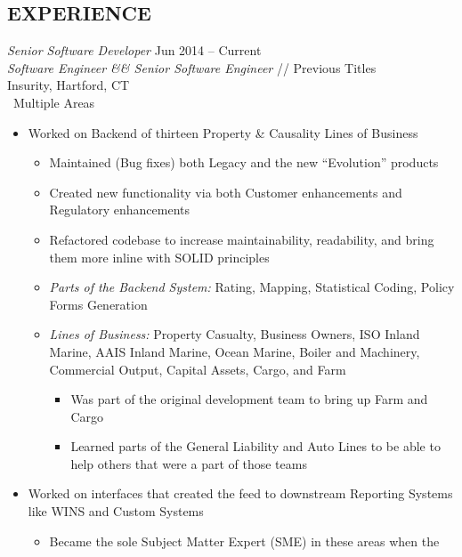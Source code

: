 \documentclass[margin]{res}
\begin{document}
\begin{resume}
   \section{EXPERIENCE} 
   {\sl Senior Software Developer} \hfill Jun 2014 -- Current \\
   {\sl Software Engineer \&\& Senior Software Engineer} \hfill // Previous Titles \\
   Insurity, Hartford, CT\\\
   Multiple Areas
   \begin{itemize}  %
      \item Worked on Backend of thirteen Property \& Causality Lines of Business
      \begin{itemize}
      	 \item Maintained (Bug fixes) both Legacy and the new ``Evolution'' products
      	 \item Created new functionality via both Customer enhancements and \\
      	    Regulatory enhancements
      	 \item Refactored codebase to increase maintainability, readability, 
      	    and bring them more inline with SOLID principles
      	 \item {\sl Parts of the Backend System:} Rating, Mapping, Statistical Coding, 
      	    Policy Forms Generation
      	 \item {\sl Lines of Business:} Property Casualty, Business Owners, ISO Inland \\
      	     Marine, AAIS Inland Marine, Ocean Marine, Boiler and Machinery, \\
      	     Commercial Output, Capital Assets, Cargo, and Farm
      	     \begin{itemize}
      	        \item Was part of the original development team to bring up Farm and 
      	           Cargo
      	        \item Learned parts of the General Liability and Auto Lines to be able 
      	           to help others that were a part of those teams
      	     \end{itemize}
      \end{itemize}
      \item Worked on interfaces that created the feed to downstream Reporting 
         Systems like WINS and Custom Systems
         \begin{itemize}
            \item Became the sole Subject Matter Expert (SME) in these areas when the 

\end{itemize}
\end{itemize}
\end{resume}
\end{document}
